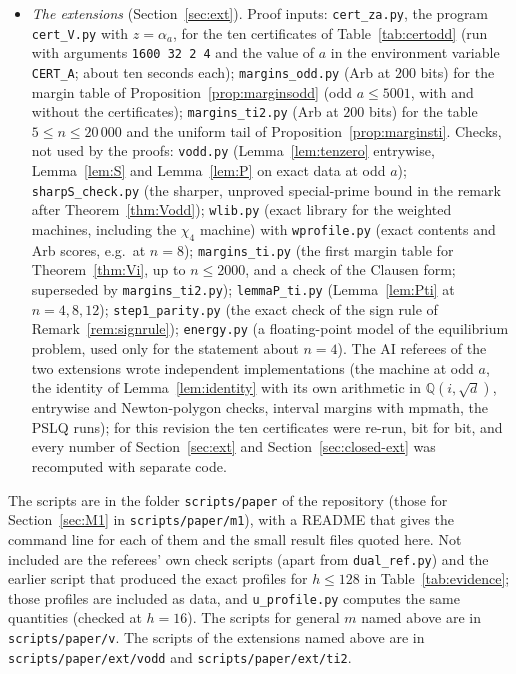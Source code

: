 \documentclass[11pt]{amsart}
\theoremstyle{definition}
\theoremstyle{remark}
\numberwithin{equation}{section}
\newcommand{\QQ}{\mathbb{Q}}
\begin{document}
\begin{itemize}
  implementation of the machine for general $m$, which checked these lemmas in $47$ pairs $(m,h)$ and reproduced the
  scores it recomputed; the referee also re-ran \texttt{cert\_V.py} at $m=4$ (same result bit for bit), compared it with
  an independent primal computation, and recomputed the margins with its own code.
\item \emph{The extensions} (Section~\ref{sec:ext}). Proof inputs: \texttt{cert\_za.py}, the program
  \texttt{cert\_V.py} with $z=\alpha_a$, for the ten certificates of Table~\ref{tab:certodd} (run with arguments
  \texttt{1600 32 2 4} and the value of $a$ in the environment variable \texttt{CERT\_A}; about ten seconds each);
  \texttt{margins\_odd.py} (Arb at $200$ bits) for the margin table of Proposition~\ref{prop:marginsodd} (odd $a\le5001$,
  with and without the certificates); \texttt{margins\_ti2.py} (Arb at $200$ bits) for the table $5\le n\le20\,000$ and the
  uniform tail of Proposition~\ref{prop:marginsti}. Checks, not used by the proofs: \texttt{vodd.py} (Lemma~\ref{lem:tenzero}
  entrywise, Lemma~\ref{lem:S} and Lemma~\ref{lem:P} on exact data at odd $a$); \texttt{sharpS\_check.py} (the sharper,
  unproved special-prime bound in the remark after Theorem~\ref{thm:Vodd}); \texttt{wlib.py} (exact library for the
  weighted machines, including the $\chi_4$ machine) with \texttt{wprofile.py} (exact contents and Arb scores, e.g.\ at
  $n=8$); \texttt{margins\_ti.py} (the first margin table for Theorem~\ref{thm:Vi}, up to $n\le2000$, and a check of the
  Clausen form; superseded by \texttt{margins\_ti2.py}); \texttt{lemmaP\_ti.py} (Lemma~\ref{lem:Pti} at $n=4,8,12$);
  \texttt{step1\_parity.py} (the exact check of the sign rule of Remark~\ref{rem:signrule}); \texttt{energy.py} (a
  floating-point model of the equilibrium problem, used only for the statement about $n=4$). The AI referees of the two
  extensions wrote independent implementations (the machine at odd $a$, the identity of Lemma~\ref{lem:identity} with its
  own arithmetic in $\QQ(i,\sqrt d)$, entrywise and Newton-polygon checks, interval margins with mpmath, the PSLQ runs);
  for this revision the ten certificates were re-run, bit for bit, and every number of Section~\ref{sec:ext} and
  Section~\ref{sec:closed-ext} was recomputed with separate code.
\end{itemize}
The scripts are in the folder \texttt{scripts/paper} of the repository \cite{PiTwoRepo} (those
for Section~\ref{sec:M1} in \texttt{scripts/paper/m1}), with a README that gives the command line for each of them and
the small result files quoted here. Not included are the referees' own check scripts (apart from \texttt{dual\_ref.py})
and the earlier script that produced the exact profiles for $h\le128$ in Table~\ref{tab:evidence}; those profiles are
included as data, and \texttt{u\_profile.py} computes the same quantities (checked at $h=16$). The scripts for general
$m$ named above are in \texttt{scripts/paper/v}.
The scripts of the extensions named above are in \texttt{scripts/paper/ext/vodd} and \texttt{scripts/paper/ext/ti2}.
\end{document}
